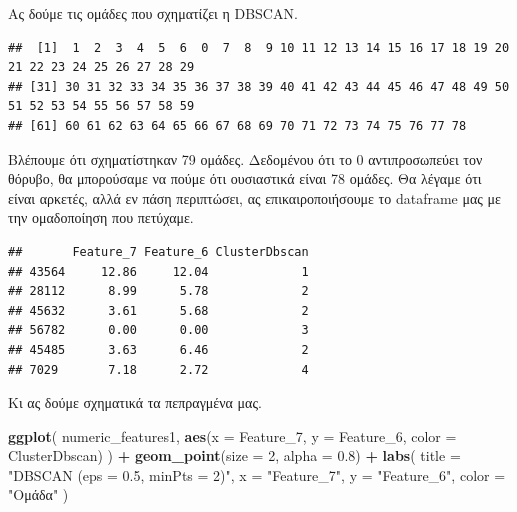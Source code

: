 \documentclass[
]{article}
\newenvironment{Shaded}{\begin{snugshade}}{\end{snugshade}}
\newcommand{\AttributeTok}[1]{\textcolor[rgb]{0.13,0.29,0.53}{#1}}
\newcommand{\DecValTok}[1]{\textcolor[rgb]{0.00,0.00,0.81}{#1}}
\newcommand{\FloatTok}[1]{\textcolor[rgb]{0.00,0.00,0.81}{#1}}
\newcommand{\FunctionTok}[1]{\textcolor[rgb]{0.13,0.29,0.53}{\textbf{#1}}}
\newcommand{\NormalTok}[1]{#1}
\newcommand{\OtherTok}[1]{\textcolor[rgb]{0.56,0.35,0.01}{#1}}
\newcommand{\SpecialCharTok}[1]{\textcolor[rgb]{0.81,0.36,0.00}{\textbf{#1}}}
\newcommand{\StringTok}[1]{\textcolor[rgb]{0.31,0.60,0.02}{#1}}
\begin{document}
Ας δούμε τις ομάδες που σχηματίζει η DBSCAN.

\begin{Shaded}
\end{Shaded}

\begin{verbatim}
##  [1]  1  2  3  4  5  6  0  7  8  9 10 11 12 13 14 15 16 17 18 19 20 21 22 23 24 25 26 27 28 29
## [31] 30 31 32 33 34 35 36 37 38 39 40 41 42 43 44 45 46 47 48 49 50 51 52 53 54 55 56 57 58 59
## [61] 60 61 62 63 64 65 66 67 68 69 70 71 72 73 74 75 76 77 78
\end{verbatim}

Βλέπουμε ότι σχηματίστηκαν 79 ομάδες. Δεδομένου ότι το 0 αντιπροσωπεύει
τον θόρυβο, θα μπορούσαμε να πούμε ότι ουσιαστικά είναι 78 ομάδες. Θα
λέγαμε ότι είναι αρκετές, αλλά εν πάση περιπτώσει, ας επικαιροποιήσουμε
το dataframe μας με την ομαδοποίηση που πετύχαμε.

\begin{Shaded}
\end{Shaded}

\begin{verbatim}
##       Feature_7 Feature_6 ClusterDbscan
## 43564     12.86     12.04             1
## 28112      8.99      5.78             2
## 45632      3.61      5.68             2
## 56782      0.00      0.00             3
## 45485      3.63      6.46             2
## 7029       7.18      2.72             4
\end{verbatim}

Κι ας δούμε σχηματικά τα πεπραγμένα μας.

\begin{Shaded}
\begin{Highlighting}[]
\FunctionTok{ggplot}\NormalTok{(}
\NormalTok{  numeric\_features1,}
  \FunctionTok{aes}\NormalTok{(}\AttributeTok{x =}\NormalTok{ Feature\_7, }\AttributeTok{y =}\NormalTok{ Feature\_6, }\AttributeTok{color =}\NormalTok{ ClusterDbscan)}
\NormalTok{) }\SpecialCharTok{+}
  \FunctionTok{geom\_point}\NormalTok{(}\AttributeTok{size =} \DecValTok{2}\NormalTok{, }\AttributeTok{alpha =} \FloatTok{0.8}\NormalTok{) }\SpecialCharTok{+}
  \FunctionTok{labs}\NormalTok{(}
    \AttributeTok{title =} \StringTok{"DBSCAN (eps = 0.5, minPts = 2)"}\NormalTok{,}
    \AttributeTok{x =} \StringTok{"Feature\_7"}\NormalTok{,}
    \AttributeTok{y =} \StringTok{"Feature\_6"}\NormalTok{,}
    \AttributeTok{color =} \StringTok{"Ομάδα"}
\NormalTok{  )}
\end{Highlighting}
\end{Shaded}
\end{document}

